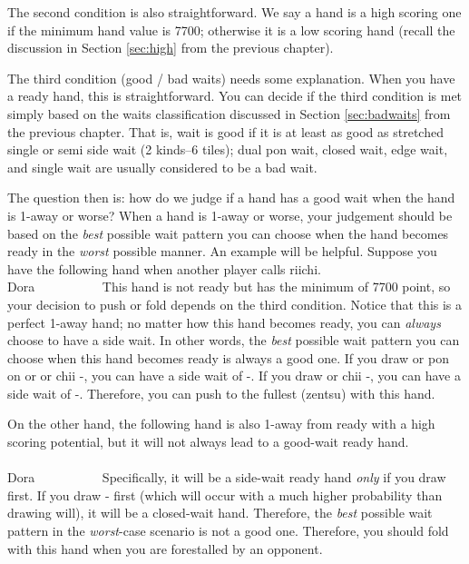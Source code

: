\bigskip
The second condition is also straightforward. We say a hand is a high scoring one if the minimum hand value is 7700; otherwise it is a low scoring hand (recall the discussion in Section \ref{sec:high} from the previous chapter). 

\bigskip
The third condition (good / bad waits) needs some explanation. When you have a ready hand, this is straightforward. You can decide if the third condition is met simply based on the waits classification discussed in Section \ref{sec:badwaits} from the previous chapter. That is, wait is good if it is at least as good as stretched single or semi side wait (2 kinds--6 tiles); dual {\jap pon} wait, closed wait, edge wait, and single wait are usually considered to be a bad wait. 

\bigskip
The question then is: how do we judge if a hand has a good wait when the hand is 1-away or worse? 
When a hand is 1-away or worse, your judgement should be based on the \emph{best} possible wait pattern you can choose when the hand becomes ready in the \emph{worst} possible manner. An example will be helpful. Suppose you have the following hand when another player calls riichi. 
\bp
{}\fa\fa\fa\bei~~\fa\\
\hfill\footnotesize{{\jap Dora}~~~~~~~~~~}
\ep {}
This hand is not ready but has the minimum of 7700 point, so your decision to push or fold depends on the third condition. Notice that this is a perfect 1-away hand; no matter how this hand becomes ready, you can \emph{always} choose to have a side wait. In other words, the \emph{best} possible wait pattern you can choose when this hand becomes ready is always a good one. If you draw or {\jap pon} on {\LARGE {}} or {\LARGE {}} or {\jap chii} {\LARGE {}-}, you can have a side wait of {\LARGE{}-}. If you draw or {\jap chii} {\LARGE {}-}, you can have a side wait of {\LARGE{}-}. Therefore, you can push to the fullest ({\jap zentsu}) with this hand.

\bigskip
On the other hand, the following hand is also 1-away from ready with a high scoring potential, but it will not always lead to a good-wait ready hand. 
\vspace{-25pt}
\bp 
{}\\ \vspace{-16pt}
\rfd{}\bei~~\\
\hfill\footnotesize{{\jap Dora}~~~~~~~~~~}
\ep
Specifically, it will be a side-wait ready hand \emph{only} if you draw {\LARGE{}} first. If you draw {\LARGE{}-} first (which will occur with a much higher probability than drawing {\LARGE{}} will), it will be a closed-wait hand. Therefore, the \emph{best} possible wait pattern in the \emph{worst}-case scenario is not a good one. Therefore, you should fold with this hand when you are forestalled by an opponent. 

